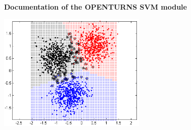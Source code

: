 % 
\vspace*{2cm}

\begin{center}
  {\huge \bf Documentation of the OPENTURNS SVM module}

  \vspace{200pt}
  \includegraphics[width=200pt]{logoOTSVM.png}
 
\end{center}

